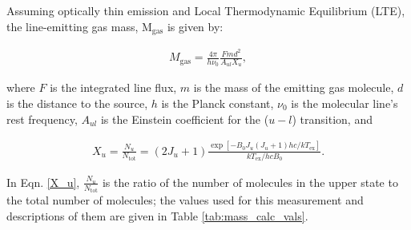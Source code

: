 Assuming optically thin emission and Local Thermodynamic Equilibrium (LTE), the line-emitting gas mass, M$_{\text{gas}}$ is given by:

\begin{align}
  M_{\text{gas}}= \frac{4 \pi}{h \nu_0} \frac{F m d^2}{A_{ul} X_u},
  \label{M_gas}
\end{align}

where $F$ is the integrated line flux, $m$ is the mass of the emitting gas molecule, $d$ is the distance to the source, $h$ is the Planck constant, $\nu_0$ is the molecular line's rest frequency, $A_{ul}$ is the Einstein coefficient for the ($u - l$) transition, and

\begin{align}
  X_u = \frac{N_u}{N_{\text{tot}}} = (2 J_u + 1) \frac{\exp [-B_0 J_u (J_u + 1) h c/kT_{\text{ex}}]}{kT_{\text{ex}}/hc B_0}.
  \label{X_u}
\end{align}

In Eqn. \ref{X_u}, $\frac{N_u}{N_{\text{tot}}}$ is the ratio of the number of molecules in the upper state to the total number of molecules; the values used for this measurement and descriptions of them are given in Table \ref{tab:mass_calc_vals}. %



